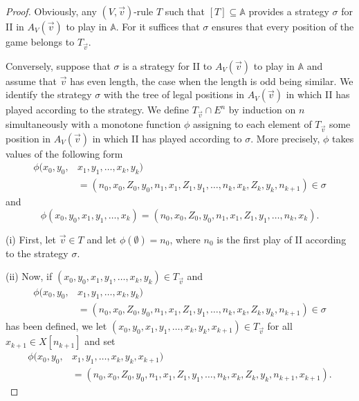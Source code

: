 \documentclass[10pt]{amsart}
\newcommand {\A}{\mathbb A}
\newcommand{\tom} {\emptyset}
\theoremstyle{definition}
\begin{document}
\begin{proof}Obviously, any $(V,\vec v)$-rule $T$ such that $[T]\subseteq \A$ provides a strategy $\sigma$ for II in $A_V(\vec v)$ to play in $\A$. For it suffices that $\sigma$ ensures that every position of the game belongs to $T_{\vec v}$.


Conversely, suppose that $\sigma$ is a strategy for II to $A_V(\vec v)$ to play in $\A$ and assume that $\vec v$ has even length,  the case when the length is odd being similar. We identify the strategy $\sigma$ with the tree of legal positions in $A_V(\vec v)$ in which II has played according to the strategy.
We define $T_{\vec v}\cap E^n$ by induction on $n$ simultaneously with a monotone function $\phi$ assigning to each element of $T_{\vec v}$ some position in $A_V(\vec v)$ in which II has played according to $\sigma$. More precisely, $\phi$ takes values of the following form
\begin{displaymath}\begin{split}
\phi(x_0,y_0,&x_1,y_1,\ldots,x_k,y_k)\\
&=(n_0,x_0,Z_0,y_0,n_1,x_1,Z_1,y_1,\ldots,n_k,x_k,Z_k,y_k,n_{k+1})\in \sigma
\end{split}\end{displaymath}
and
$$
\phi(x_0,y_0,x_1,y_1,\ldots,x_k)=(n_0,x_0,Z_0,y_0,n_1,x_1,Z_1,y_1,\ldots,n_k,x_k).
$$


\noindent (i) First, let $\vec v\in T$ and let $\phi(\tom)=n_0$, where $n_0$ is the first play of II according to the strategy $\sigma$. 

\noindent (ii) Now, if $(x_0,y_0,x_1,y_1,\ldots,x_k,y_k)\in T_{\vec v}$ and 
\begin{displaymath}\begin{split}
\phi(x_0,y_0,&x_1,y_1,\ldots,x_k,y_k)\\
&=(n_0,x_0,Z_0,y_0,n_1,x_1,Z_1,y_1,\ldots,n_k,x_k,Z_k,y_k,n_{k+1})\in \sigma
\end{split}\end{displaymath}
has been defined, we let $(x_0,y_0,x_1,y_1,\ldots,x_k,y_k,x_{k+1})\in T_{\vec v}$ for all $x_{k+1}\in X[n_{k+1}]$ and set
\begin{displaymath}\begin{split}
\phi(x_0,y_0,&x_1,y_1,\ldots,x_k,y_k,x_{k+1})\\
&=(n_0,x_0,Z_0,y_0,n_1,x_1,Z_1,y_1,\ldots,n_k,x_k,Z_k,y_k,n_{k+1},x_{k+1}).
\end{split}\end{displaymath}



\end{proof}
\end{document}

